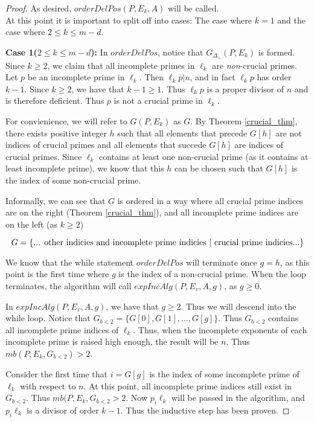 \documentclass[../paper.tex]{subfiles}
\begin{document}
\begin{proof}
As desired, $orderDelPos(P, E_k, A)$ will be called.
\\
 
At this point it is important to split off into cases: The case
where $k = 1$ and the case where $2 \leq k \leq m - d$.

\textbf{Case 1($2 \leq k \leq m - d$):} In $orderDelPos$, notice 
that $G_{\Delta_+}(P,E_k)$ is formed. Since $k \geq 2$, we claim that
all incomplete primes in $\ell_k$ are \textit{non}-crucial primes.
Let $p$ be an incomplete prime in $\ell_k$. Then $\ell_k p | n$,
and in fact $\ell_k p$ has order $k - 1$. Since $k \geq 2$, we
have that $k - 1 \geq 1$. Thus $\ell_k p$ is a proper divisor of
$n$ and is therefore deficient. Thus $p$ is not a crucial prime in
$\ell_k$.

For convienience, we will refer to $G(P,E_k)$ as $G$. By Theorem
{\ref{crucial_thm}}, there exists positive integer $h$ such that
all elements that precede $G[h]$ are not indices of crucial primes
and all elements that succede $G[h]$ are indices of crucial
primes. Since $\ell_k$ contains at least one non-crucial prime (as
it contains at least incomplete prime), we know that this $h$ can
be chosen such that $G[h]$ is the index of some non-crucial prime.

Informally, we can see that $G$ is ordered in a way where all 
crucial prime indices are on the right (Theorem {\ref{crucial_thm}}), 
and all incomplete prime indices are on the left (as $k \geq 2$)

$$ G = \{ \text{... other indicies and incomplete prime indicies 
$ | $ crucial prime indicies...} \} $$

We know that the while statement
$orderDelPos$ will terminate once $g = h$, as this point is the
first time where $g$ is the index of a non-crucial prime. When
the loop terminates, the algorithm will call $expIncAlg(P,E_v, A,
g)$, as $g \geq 0$. 

In $expIncAlg(P,E_v,A, g)$, we have that $g \geq 2$. Thus we will
descend into the while loop. Notice that $G_{b<2} = \{G[0], G[1], 
..., G[g]\}$. Thus $G_{b<2}$ contains all incomplete prime indices
of $\ell_k$. Thus, when the incomplete exponents of each incomplete 
prime is raised high enough, the result will be $n$. 
Thus $mb(P,E_k, G_{b<2}) > 2$.

Consider the first time that $i = G[g]$ is the index of some
incomplete prime of $\ell_k$ with respect to $n$. At this point, 
all incomplete prime indices still exist in $G_{b<2}$. 
Thus $mb(P, E_k, G_{b<2} > 2$. 
Now $p_i \ell_k$ will be passed in the algorithm, and $p_i \ell_k$
is a divisor of order $k-1$. Thus the inductive step has been proven.


\end{proof}
\end{document}
